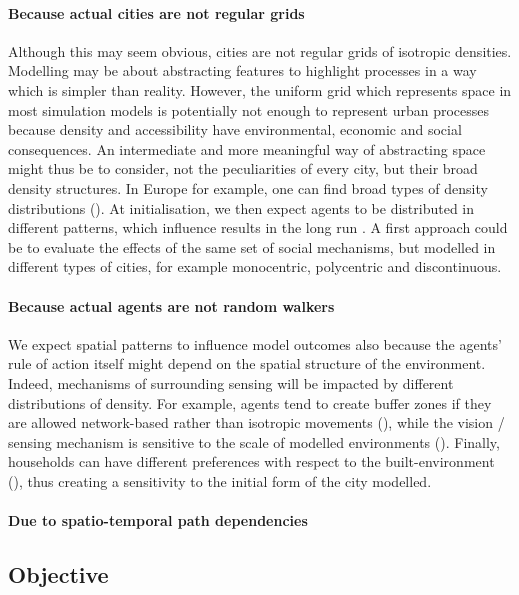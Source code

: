 \documentclass[Afour,sageh,times]{sagej}
\begin{document}
\paragraph{Because actual cities are not regular grids}
Although this may seem obvious, cities are not regular grids of isotropic densities. Modelling may be about abstracting features to highlight processes in a way which is simpler than reality. However, the uniform grid which represents space in most simulation models is potentially not enough to represent urban processes because density and accessibility have environmental, economic and social consequences. An intermediate and more meaningful way of abstracting space might thus be to consider, not the peculiarities of every city, but their broad density structures. In Europe for example, one can find broad types of density distributions (\cite{LeNechet2015}). At initialisation, we then expect agents to be distributed in different patterns, which influence results in the long run \cite{Castellanoetal2009}. A first approach could be to evaluate the effects of the same set of social mechanisms, but modelled in different types of cities, for example monocentric, polycentric and discontinuous.

\paragraph{Because actual agents are not random walkers}
We expect spatial patterns to influence model outcomes also because the agents' rule of action itself might depend on the spatial structure of the environment. Indeed, mechanisms of surrounding sensing will be impacted by different distributions of density. For example, agents tend to create buffer zones if they are allowed network-based rather than isotropic movements (\cite{Banos2012}), while the vision / sensing mechanism is sensitive to the scale of modelled environments (\cite{LauriJaggi2003, FossettDietrich2009}). Finally, households can have different preferences with respect to the built-environment (\cite{SpielmanHarrison2014}), thus creating a sensitivity to the initial form of the city modelled.

\paragraph{Due to spatio-temporal path dependencies}



\subsection{Objective}
\end{document}
